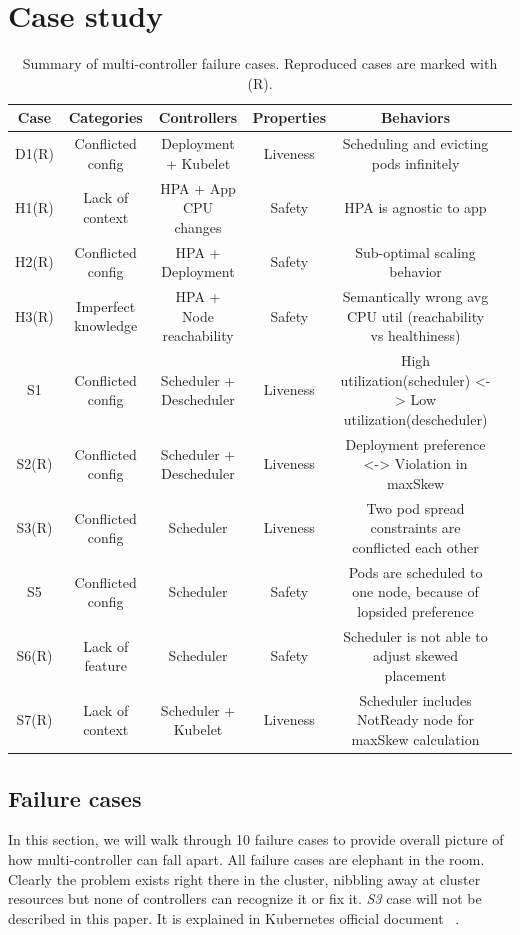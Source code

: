 \section{Case study}
\label{sec:case_study}

\begin{table}[t]
    \centering
    \begin{tabular}{c c c c c c}
    \hline
        Case & Categories & Controllers & Properties & Behaviors  \\ 
        \hline
        D1(R) & Conflicted config & Deployment + Kubelet & Liveness & Scheduling and evicting pods infinitely  \\ 
        H1(R) & Lack of context & HPA + App CPU changes & Safety & HPA is agnostic to app  \\ 
        H2(R) & Conflicted config & HPA + Deployment & Safety & Sub-optimal scaling behavior  \\ 
        H3(R) & Imperfect knowledge & HPA + Node reachability & Safety & Semantically wrong avg CPU util (reachability vs healthiness)  \\ 
        S1 & Conflicted config & Scheduler + Descheduler & Liveness & High utilization(scheduler) <-> Low utilization(descheduler) \\ 
        S2(R) & Conflicted config & Scheduler + Descheduler & Liveness & Deployment preference <-> Violation in maxSkew \\ 
        S3(R) & Conflicted config & Scheduler & Liveness & Two pod spread constraints are conflicted each other  \\ 
        S5 & Conflicted config & Scheduler & Safety & Pods are scheduled to one node, because of lopsided preference  \\ 
        S6(R) & Lack of feature & Scheduler & Safety & Scheduler is not able to adjust skewed placement  \\ 
        S7(R) & Lack of context & Scheduler + Kubelet & Liveness & Scheduler includes NotReady node for maxSkew calculation  \\ 
        \hline
    \end{tabular}
    \caption{Summary of multi-controller failure cases. Reproduced cases are marked with (R).}
    \label{table:summary}
\end{table}

\subsection*{Failure cases}
In this section, we will walk through 10 failure cases to provide overall picture of how multi-controller can fall apart. All failure cases are elephant in the room. Clearly the problem exists right there in the cluster, nibbling away at cluster resources but none of controllers can recognize it or fix it.  \textit{S3} case will not be described in this paper. It is explained in Kubernetes official document ~\cite{}.


